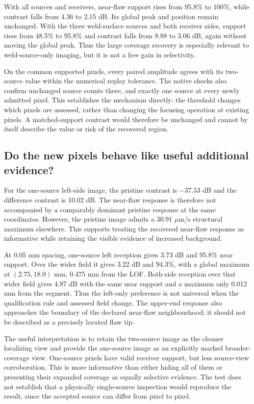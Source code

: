 With all sources and receivers, near-flaw support rises from 95.8\% to 100\%, while contrast falls from 4.36 to 2.15 dB. Its global peak and position remain unchanged. With the three weld-surface sources and both receiver sides, support rises from 48.5\% to 95.8\% and contrast falls from 8.88 to 3.06 dB, again without moving the global peak. Thus the large coverage recovery is especially relevant to weld-source-only imaging, but it is not a free gain in selectivity.

On the common supported pixels, every paired amplitude agrees with its two-source value within the numerical replay tolerance. The native checks also confirm unchanged source counts there, and exactly one source at every newly admitted pixel. This establishes the mechanism directly: the threshold changes which pixels are assessed, rather than changing the focusing operation at existing pixels. A matched-support contrast would therefore be unchanged and cannot by itself describe the value or risk of the recovered region.

\subsection{Do the new pixels behave like useful additional evidence?}
For the one-source left-side image, the pristine contrast is $-37.53$ dB and the difference contrast is 10.02 dB. The near-flaw response is therefore not accompanied by a comparably dominant pristine response at the same coordinates. However, the pristine image admits a 30.91 $\mu$m/s structural maximum elsewhere. This supports treating the recovered near-flaw response as informative while retaining the visible evidence of increased background.

At 0.05 mm spacing, one-source left reception gives 3.73 dB and 95.8\% near support. Over the wider field it gives 3.22 dB and 94.3\%, with a global maximum at $(2.75,18.0)$ mm, 0.475 mm from the LOF. Both-side reception over that wider field gives 4.87 dB with the same near support and a maximum only 0.012 mm from the segment. Thus the left-only preference is not universal when the qualification rule and assessed field change. The upper-end response also approaches the boundary of the declared near-flaw neighbourhood; it should not be described as a precisely located flaw tip.

The useful interpretation is to retain the two-source image as the cleaner localizing view and provide the one-source image as an explicitly marked broader-coverage view. One-source pixels have valid receiver support, but less source-view corroboration. This is more informative than either hiding all of them or presenting their expanded coverage as equally selective evidence. The test does not establish that a physically single-source inspection would reproduce the result, since the accepted source can differ from pixel to pixel.


